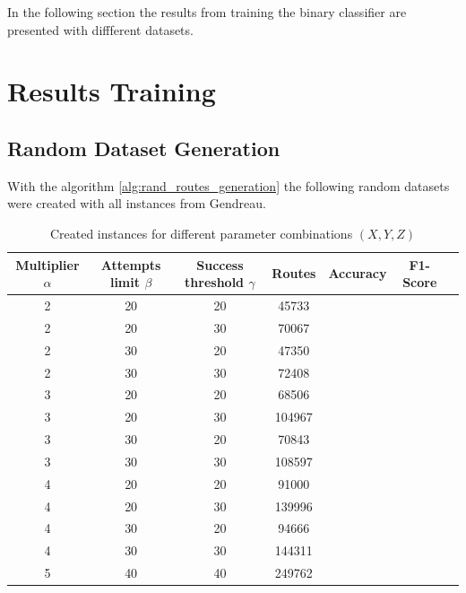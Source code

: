 In the following section the results from training the binary classifier are presented with diffferent datasets.

\section{Results Training}
\label{sec:ResultsTraining}

\subsection{Random Dataset Generation}
With the algorithm \ref{alg:rand_routes_generation} the following random datasets were created with all
instances from Gendreau.
\begin{table}[h!]
    \centering
    \begin{tabular}{c c cc c c c}
        \hline
        Multiplier $\alpha$ & Attempts limit $\beta$ & Success threshold $\gamma$ & Routes & Accuracy & F1-Score \\
        \hline
        2                   & 20                     & 20                         & 45733  &          &          \\
        2                   & 20                     & 30                         & 70067  &          &          \\
        2                   & 30                     & 20                         & 47350  &          &          \\
        2                   & 30                     & 30                         & 72408  &          &          \\
        3                   & 20                     & 20                         & 68506  &          &          \\
        3                   & 20                     & 30                         & 104967 &          &          \\
        3                   & 30                     & 20                         & 70843  &          &          \\
        3                   & 30                     & 30                         & 108597 &          &          \\
        4                   & 20                     & 20                         & 91000  &          &          \\
        4                   & 20                     & 30                         & 139996 &          &          \\
        4                   & 30                     & 20                         & 94666  &          &          \\
        4                   & 30                     & 30                         & 144311 &          &          \\
        5                   & 40                     & 40                         & 249762 &          &          \\
        \hline
    \end{tabular}
    \caption{Created instances for different parameter combinations $(X, Y, Z)$}
    \label{tab:created_instances_gendreau}
\end{table}

